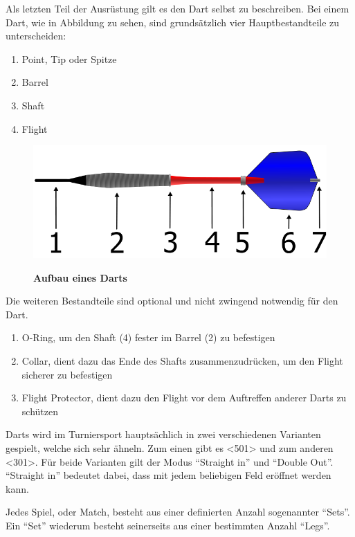 Als letzten Teil der Ausrüstung gilt es den Dart selbst zu beschreiben. Bei einem Dart, wie in Abbildung  zu sehen, sind grundsätzlich vier Hauptbestandteile zu unterscheiden:
\begin{enumerate}
    \item Point, Tip oder Spitze
    \item Barrel
    \addtocounter{enumi}{1}
    \item Shaft
    \addtocounter{enumi}{1}
    \item Flight
\end{enumerate}
\begin{figure}
\includegraphics[width=\textwidth]{media/Dart}\\
\caption{\textbf{Aufbau eines Darts\cite{dart2006}}
}
\label{Fig:darts}
\end{figure}
Die weiteren Bestandteile sind optional und nicht zwingend notwendig für den Dart. 
\begin{enumerate}
	\addtocounter{enumi}{1}
	\addtocounter{enumi}{1}
    \item O-Ring, um den Shaft (4) fester im Barrel (2) zu befestigen
    \addtocounter{enumi}{1}
    \item Collar, dient dazu das Ende des Shafts zusammenzudrücken, um den Flight sicherer zu befestigen
    \addtocounter{enumi}{1}
    \item Flight Protector, dient dazu den Flight vor dem Auftreffen anderer Darts zu schützen

\end{enumerate}

Darts wird im Turniersport hauptsächlich in zwei verschiedenen Varianten gespielt, welche sich sehr ähneln. Zum einen gibt es <501> und zum anderen <301>. Für beide Varianten gilt der Modus "`Straight in"' und "`Double Out"'.
"`Straight in"' bedeutet dabei, dass mit jedem beliebigen Feld eröffnet werden kann.

Jedes Spiel, oder Match, besteht aus einer definierten Anzahl sogenannter "`Sets"'. Ein "`Set"' wiederum besteht seinerseits aus einer bestimmten Anzahl "`Legs"'.

